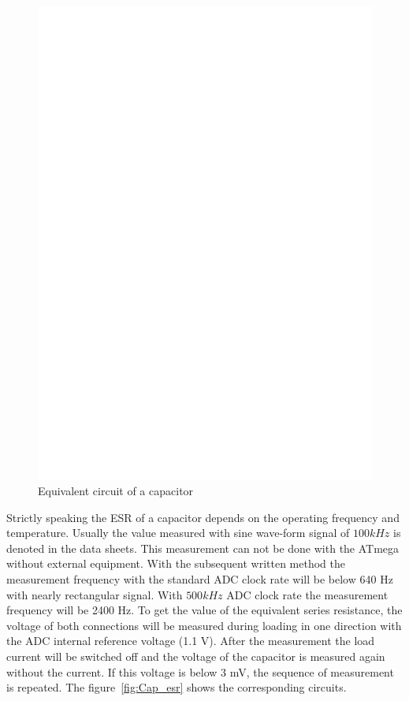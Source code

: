 \begin{figure}[H]
  \centering
    \includegraphics[]{../FIG/Cap_equiv.eps}
  \caption{Equivalent circuit of a capacitor}
  \label{fig:Cap_equiv}
\end{figure}

Strictly speaking the ESR of a capacitor depends on the operating frequency and temperature.
Usually the value measured with sine wave-form signal of \(100 kHz\) is denoted in the data sheets.
This measurement can not be done with the ATmega without external equipment.
With the subsequent written method the measurement frequency with the standard ADC clock rate will be below 640 Hz
with nearly rectangular signal. With \(500 kHz\) ADC clock rate the measurement frequency will be 2400 Hz.
To get the value of the equivalent series resistance,
the voltage of both connections will be measured during loading in one direction with the ADC internal reference 
voltage (1.1 V).
After the measurement the load current will be switched off and the voltage of the capacitor is measured
again without the current.
If this voltage is below 3 mV, the sequence of measurement is repeated.
The figure~\ref{fig:Cap_esr} shows the corresponding circuits.

